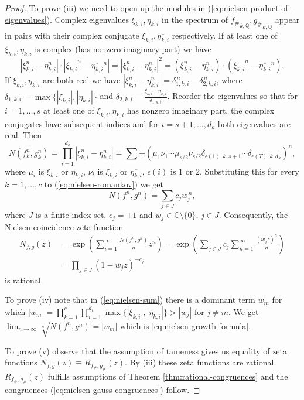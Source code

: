 \documentclass[12pt, a4paper]{amsart}
\newcommand{\ov}[1]{\overline{#1}}
\begin{document}
\begin{proof}
  To prove (iii) we need to open up the modules in (\ref{eq:nielsen-product-of-eigenvalues}).
  Complex eigenvalues $\xi_{k,i}, \eta_{k,i}$ in the spectrum of ${f_\#}_{k,\mathbb{Q}}, {g_\#}_{k,\mathbb{Q}}$
  appear in pairs with their complex conjugate $\ov{\xi_{k,i}}, \ov{\eta_{k,i}}$ respectively.
  If at least one of $\xi_{k,i}, \eta_{k,i}$ is complex (has nonzero imaginary part) we have
  \[
    |\xi_{k,i}^n - \eta_{k,i}^n| \cdot |\ov{\xi_{k,i}}^n - \ov{\eta_{k,i}}^n|
    = |\xi_{k,i}^n - \eta_{k,i}^n|^2
    = (\xi_{k,i}^n - \eta_{k,i}^n) \cdot (\ov{\xi_{k,i}}^n - \ov{\eta_{k,i}}^n).
  \]
  If $\xi_{k,i}, \eta_{k,i}$ are both real we have
  $|\xi_{k,i}^n - \eta_{k,i}^n| = \delta_{1,k,i}^{\, n} - \delta_{2,k,i}^{\, n}$, where
  $\delta_{1,k,i} = \max\{| \xi_{k,i} |, |\eta_{k,i}|\} $ and
  $\delta_{2,k,i}=\frac{\xi_{k,i} \, \cdot \, \eta_{k,i}}{\delta_{1,k,i}}$.
  Reorder the eigenvalues so that for $i=1,\dots,s$ at least one of $\xi_{k,i}, \eta_{k,i}$
  has nonzero imaginary part, the complex conjugates have subsequent indices
  and for $i=s+1,\dots,d_k$ both eigenvalues are real. Then
  \begin{equation}
      N(f_k^n, g_k^n)
      = \prod_{i=1}^{d_k} | \xi_{k,i}^n - \eta_{k,i}^n|
      = \sum \pm (\mu_1 \nu_1 \cdots \mu_{s/2} \nu_{s/2}
      \delta_{\epsilon(1),k,s+1} \cdots \delta_{\epsilon(T),k,d_k})^n,
  \end{equation}
  where $\mu_i$ is $\xi_{k,i}$ or $\eta_{k,i}$, $\nu_i$ is $\ov{\xi_{k,i}}$ or $\ov{\eta_{k,i}}$,
  $\epsilon(i)$ is $1$ or $2$.
  Substituting this for every $k=1,\dots,c$ to (\ref{eq:nielsen-romankov}) we get
  \begin{equation}\label{eq:nielsen-sum}
      N(f^n, g^n) = \sum_{j \in J} c_jw_j^{\, n},
  \end{equation}
  where $J$ is a finite index set, $c_j =\pm 1$ and $ w_j \in \mathbb{C} \setminus \{0\}$, $j\in J$.
  Consequently, the Nielsen coincidence zeta function
  \begin{align*}
    N_{f,g}(z) &= \exp \left( \sum_{i=1}^\infty \frac{N(f^n, g^n)}{n} z^n \right)
    = \exp \left( \sum_{j \in J} c_j \sum_{n=1}^\infty \frac{(w_jz)^n}{n} \right) \\
    &= \prod_{j \in J} (1 - w_jz)^{-c_j}
  \end{align*}
  is rational.

  To prove (iv) note that in (\ref{eq:nielsen-sum}) there is a dominant term $w_m$ for which
  $|w_m| = \prod_{k=1}^c \prod_{i=1}^{d_k} \max \{|\xi_{k,i}|, |\eta_{k,i}|\} > |w_j|$ for $j \neq m$.
  We get $\lim_{n \to \infty} \sqrt[n]{N(f^n, g^n)} = |w_m|$ which is \eqref{eq:nielsen-growth-formula}.

  To prove (v) observe that the assumption of tameness gives us equality of zeta functions
  $N_{f,g}(z) \equiv R_{f_\#,g_\#}(z)$.
  By (iii) these zeta functions are rational.
  $R_{f_\#,g_\#}(z)$ fulfills assumptions of Theorem \ref{thm:rational-congruences}
  and the congruences (\ref{eq:nielsen-gauss-congruences}) follow.
\end{proof}
\end{document}
